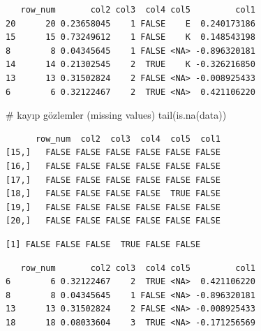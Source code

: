 \documentclass[
  letterpaper,
  DIV=11,
  numbers=noendperiod]{scrreprt}
\newenvironment{Shaded}{\begin{snugshade}}{\end{snugshade}}
\newcommand{\CommentTok}[1]{\textcolor[rgb]{0.37,0.37,0.37}{#1}}
\newcommand{\FunctionTok}[1]{\textcolor[rgb]{0.28,0.35,0.67}{#1}}
\newcommand{\NormalTok}[1]{\textcolor[rgb]{0.00,0.23,0.31}{#1}}
\newcommand{\SpecialCharTok}[1]{\textcolor[rgb]{0.37,0.37,0.37}{#1}}
\begin{document}
\begin{verbatim}
   row_num       col2 col3  col4 col5         col1
20      20 0.23658045    1 FALSE    E  0.240173186
15      15 0.73249612    1 FALSE    K  0.148543198
8        8 0.04345645    1 FALSE <NA> -0.896320181
14      14 0.21302545    2  TRUE    K -0.326216850
13      13 0.31502824    2 FALSE <NA> -0.008925433
6        6 0.32122467    2  TRUE <NA>  0.421106220
\end{verbatim}

\begin{Shaded}
\begin{Highlighting}[]
\CommentTok{\# kayıp gözlemler (missing values)}
\FunctionTok{tail}\NormalTok{(}\FunctionTok{is.na}\NormalTok{(data))}
\end{Highlighting}
\end{Shaded}

\begin{verbatim}
      row_num  col2  col3  col4  col5  col1
[15,]   FALSE FALSE FALSE FALSE FALSE FALSE
[16,]   FALSE FALSE FALSE FALSE FALSE FALSE
[17,]   FALSE FALSE FALSE FALSE FALSE FALSE
[18,]   FALSE FALSE FALSE FALSE  TRUE FALSE
[19,]   FALSE FALSE FALSE FALSE FALSE FALSE
[20,]   FALSE FALSE FALSE FALSE FALSE FALSE
\end{verbatim}

\begin{Shaded}
\end{Shaded}

\begin{verbatim}
[1] FALSE FALSE FALSE  TRUE FALSE FALSE
\end{verbatim}

\begin{Shaded}
\end{Shaded}

\begin{verbatim}
   row_num       col2 col3  col4 col5         col1
6        6 0.32122467    2  TRUE <NA>  0.421106220
8        8 0.04345645    1 FALSE <NA> -0.896320181
13      13 0.31502824    2 FALSE <NA> -0.008925433
18      18 0.08033604    3  TRUE <NA> -0.171256569
\end{verbatim}
\end{document}
